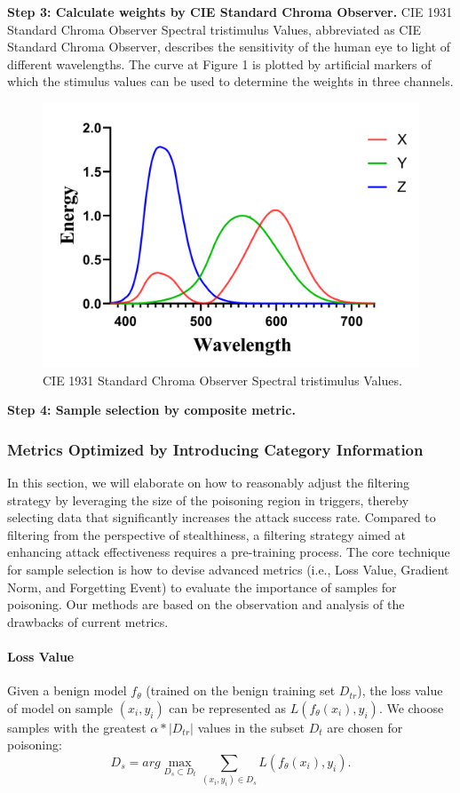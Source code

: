 \documentclass{article}
\begin{document}
\textbf{Step 3: Calculate weights by CIE Standard Chroma Observer.}  CIE 1931 Standard Chroma Observer Spectral tristimulus Values, abbreviated as CIE Standard Chroma Observer, describes the sensitivity of the human eye to light of different wavelengths. The curve at Figure 1 is plotted by artificial markers of which the stimulus values can be used to determine the weights in three channels.
\begin{figure}[htbp]
\centering
\includegraphics[width=0.5\linewidth]{Styles/figures/en-wa.png}
\caption{CIE 1931 Standard Chroma Observer Spectral tristimulus Values.} 
\end{figure}

\textbf{Step 4: Sample selection by composite metric.}
\subsubsection{Metrics Optimized by Introducing Category Information}
In this section, we will elaborate on how to reasonably adjust the filtering strategy by leveraging the size of the poisoning region in triggers, thereby selecting data that significantly increases the attack success rate. Compared to filtering from the perspective of stealthiness, a filtering strategy aimed at enhancing attack effectiveness requires a pre-training process.
The core technique for sample selection is how to devise advanced metrics (i.e.,
Loss Value, Gradient Norm, and Forgetting Event) to evaluate the importance of samples for poisoning. Our methods are based on the observation and analysis of the drawbacks of current metrics. 
\paragraph{Loss Value}
Given a benign model \(f_{\theta}\) (trained on the benign training set \(D_{tr}\)), the loss value of model on sample \((x_i,y_i)\) can be represented as \(L(f_{\theta}(x_i), y_i)\). We choose samples with the greatest \(\alpha*|D_{tr}|\) values in the subset \(D_t\) are chosen for
poisoning:
\begin{equation}
D_s = arg \max_{D_s\subset D_t}\sum_{(x_i,y_i) \in D_s}L(f_{\theta}(x_i),y_i).
\end{equation}
\end{document}
